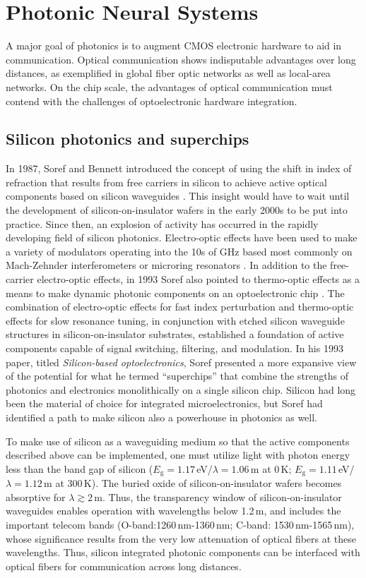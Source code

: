 \documentclass[twocolumn]{article}
\begin{document}
\section{\label{sec:photonic_neural_systems}Photonic Neural Systems}
A major goal of photonics is to augment CMOS electronic hardware to aid in communication. Optical communication shows indisputable advantages over long distances, as exemplified in global fiber optic networks as well as local-area networks. On the chip scale, the advantages of optical communication must contend with the challenges of optoelectronic hardware integration. 

\subsection{Silicon photonics and superchips}
In 1987, Soref and Bennett introduced the concept of using the shift in index of refraction that results from free carriers in silicon to achieve active optical components based on silicon waveguides \cite{sobe1987}. This insight would have to wait until the development of silicon-on-insulator wafers in the early 2000s to be put into practice. Since then, an explosion of activity has occurred in the rapidly developing field of silicon photonics. Electro-optic effects have been used to make a variety of modulators \cite{rema2010} operating into the 10s of GHz based most commonly on Mach-Zehnder interferometers \cite{lisa2005} or microring resonators \cite{xuma2007}. In addition to the free-carrier electro-optic effects, in 1993 Soref also pointed to thermo-optic effects as a means to make dynamic photonic components on an optoelectronic chip \cite{so1993}. The combination of electro-optic effects for fast index perturbation and thermo-optic effects for slow resonance tuning, in conjunction with etched silicon waveguide structures in silicon-on-insulator substrates, established a foundation of active components capable of signal switching, filtering, and modulation. In his 1993 paper, titled \textit{Silicon-based optoelectronics}, Soref presented a more expansive view of the potential for what he termed ``superchips'' that combine the strengths of photonics and electronics monolithically on a single silicon chip. Silicon had long been the material of choice for integrated microelectronics, but Soref had identified a path to make silicon also a powerhouse in photonics as well.

To make use of silicon as a waveguiding medium so that the active components described above can be implemented, one must utilize light with photon energy less than the band gap of silicon ($E_{\mathrm{g}}=1.17$\,eV/$\lambda = 1.06$\,\textmu m at 0\,K; $E_{\mathrm{g}}=1.11$\,eV/$\lambda = 1.12$\,\textmu m at 300\,K). The buried oxide of silicon-on-insulator wafers becomes absorptive for $\lambda \gtrsim 2$\,\textmu m. Thus, the transparency window of silicon-on-insulator waveguides enables operation with wavelengths below 1.2\,\textmu m, and includes the important telecom bands (O-band:1260\,nm-1360\,nm; C-band: 1530\,nm-1565\,nm), whose significance results from the very low attenuation of optical fibers at these wavelengths. Thus, silicon integrated photonic components can be interfaced with optical fibers for communication across long distances. 
\end{document}
